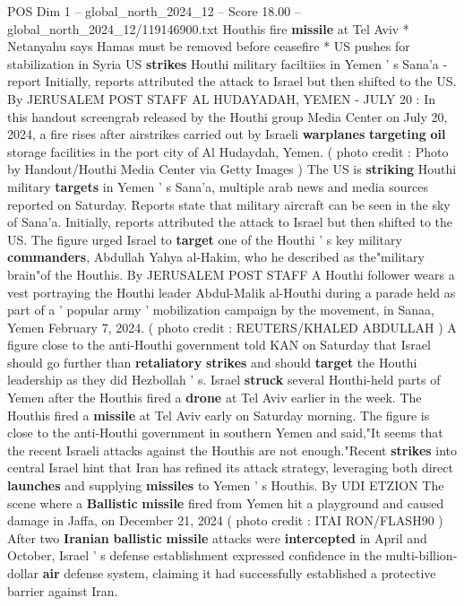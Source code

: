 \begin{textsample}{POS Dim 1 – global\_north\_2024\_12 – Score 18.00 – global\_north\_2024\_12/119146900.txt}  \label{ex:f1_pos_269}
Houthis fire \textbf{missile} at Tel Aviv * Netanyahu says Hamas must be removed before ceasefire * US pushes for stabilization in Syria US \textbf{strikes} Houthi military faciltiies in Yemen ' s Sana'a - report Initially, reports attributed the attack to Israel but then shifted to the US.
By JERUSALEM POST STAFF AL HUDAYADAH, YEMEN - JULY 20 : In this handout screengrab released by the Houthi group Media Center on July 20, 2024, a fire rises after airstrikes carried out by Israeli \textbf{warplanes} \textbf{targeting} \textbf{oil} storage facilities in the port city of Al Hudaydah, Yemen. ( photo credit : Photo by Handout/Houthi Media Center via Getty Images ) The US is \textbf{striking} Houthi military \textbf{targets} in Yemen ' s Sana'a, multiple arab news and media sources reported on Saturday.
Reports state that military aircraft can be seen in the sky of Sana'a.
Initially, reports attributed the attack to Israel but then shifted to the US.
The figure urged Israel to \textbf{target} one of the Houthi ' s key military \textbf{commanders}, Abdullah Yahya al-Hakim, who he described as the"military brain"of the Houthis.
By JERUSALEM POST STAFF A Houthi follower wears a vest portraying the Houthi leader Abdul-Malik al-Houthi during a parade held as part of a ' popular army ' mobilization campaign by the movement, in Sanaa, Yemen February 7, 2024. ( photo credit : REUTERS/KHALED ABDULLAH ) A figure close to the anti-Houthi government told KAN on Saturday that Israel should go further than \textbf{retaliatory} \textbf{strikes} and should \textbf{target} the Houthi leadership as they did Hezbollah ' s.
Israel \textbf{struck} several Houthi-held parts of Yemen after the Houthis fired a \textbf{drone} at Tel Aviv earlier in the week.
The Houthis fired a \textbf{missile} at Tel Aviv early on Saturday morning.
The figure is close to the anti-Houthi government in southern Yemen and said,"It seems that the recent Israeli attacks against the Houthis are not enough."Recent \textbf{strikes} into central Israel hint that Iran has refined its attack strategy, leveraging both direct \textbf{launches} and supplying \textbf{missiles} to Yemen ' s Houthis.
By UDI ETZION The scene where a \textbf{Ballistic} \textbf{missile} fired from Yemen hit a playground and caused damage in Jaffa, on December 21, 2024 ( photo credit : ITAI RON/FLASH90 ) After two \textbf{Iranian} \textbf{ballistic} \textbf{missile} attacks were \textbf{intercepted} in April and October, Israel ' s defense establishment expressed confidence in the multi-billion-dollar \textbf{air} defense system, claiming it had successfully established a protective barrier against Iran.

\end{textsample}
